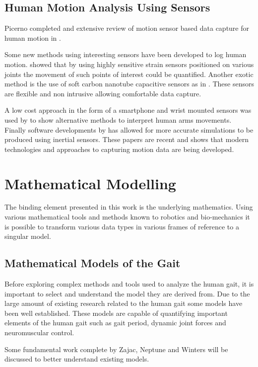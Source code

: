 \subsection{Human Motion Analysis Using Sensors}
Picerno completed and extensive review of motion sensor based data capture for human motion in \cite{picerno201725}. 

Some new methods using interesting sensors have been developed to log human motion. \cite{wang2014wearable} showed that by using highly sensitive strain sensors positioned on various joints the movement of such points of interest could be quantified. Another exotic method is the use of soft carbon nanotube capacitive sensors as in \cite{cai2013super}. These sensors are flexible and non intrusive allowing comfortable data capture.

A low cost approach in the form of a smartphone and wrist mounted sensors was used by \cite{shoaib2016complex} to show alternative methods to interpret human arms movements. Finally software developments by \cite{sun2017new} has allowed for more accurate simulations to be produced using inertial sensors. These papers are recent and shows that modern technologies and approaches to capturing motion data are being developed.


\section{Mathematical Modelling}
The binding element presented in this work is the underlying mathematics. Using various mathematical tools and methods known to robotics and bio-mechanics it is possible to transform various data types in various frames of reference to a singular model.


\subsection{Mathematical Models of the Gait}
Before exploring complex methods and tools used to analyze the human gait, it is important to select and understand the model they are derived from. Due to the large amount of existing research related to the human gait some models have been well established. These models are capable of quantifying important elements of the human gait such as gait period, dynamic joint forces and neuromuscular control. 

Some fundamental work complete by Zajac, Neptune and Winters will be discussed to better understand existing models.

